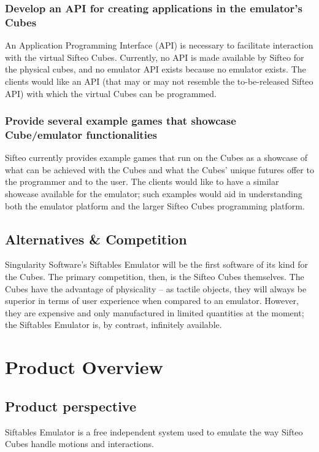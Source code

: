 \documentclass[12pt]{article}
\begin{document}
                          \subsubsection{Develop an API for creating applications in the emulator’s Cubes}
                          An Application Programming Interface (API) is necessary to facilitate interaction with the virtual Sifteo Cubes. Currently, no API is made available by Sifteo for the physical cubes, and no emulator API exists because no emulator exists. The clients would like an API (that may or may not resemble the to-be-released Sifteo API) with which the virtual Cubes can be programmed.

                          \subsubsection{Provide several example games that showcase Cube/emulator functionalities}
                          Sifteo currently provides example games that run on the Cubes as a showcase of what can be achieved with the Cubes and what the Cubes’ unique futures offer to the programmer and to the user. The clients would like to have a similar showcase available for the emulator; such examples would aid in understanding both the emulator platform and the larger Sifteo Cubes programming platform.

              \subsection{Alternatives \& Competition}
              Singularity Software’s Siftables Emulator will be the first software of its kind for the Cubes. The primary competition, then, is the Sifteo Cubes themselves. The Cubes have the advantage of physicality – as tactile objects, they will always be superior in terms of user experience when compared to an emulator. However, they are expensive and only manufactured in limited quantities at the moment; the Siftables Emulator is, by contrast, infinitely available.

\section{Product Overview}

              \subsection{Product perspective}
              Siftables Emulator is a free independent system used to emulate the way Sifteo Cubes handle motions and interactions.
\end{document}
